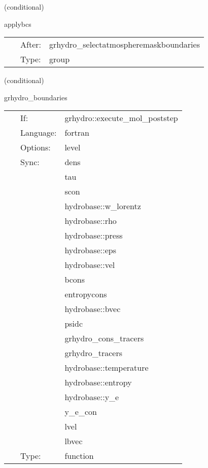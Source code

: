    (conditional) 

\hspace{5mm} applybcs 

\hspace{5mm}{\it apply boundary conditions to real-valued atmosphere mask } 


\hspace{5mm}

 \begin{tabular*}{160mm}{cll} 
~ & After:  & grhydro\_selectatmospheremaskboundaries \\ 
~ & Type:  & group \\ 
\end{tabular*} 


\vspace{5mm}

   (conditional) 

\hspace{5mm} grhydro\_boundaries 

\hspace{5mm}{\it select grhydro boundary conditions } 


\hspace{5mm}

 \begin{tabular*}{160mm}{cll} 
~ & If:  & grhydro::execute\_mol\_poststep \\ 
~ & Language:  & fortran \\ 
~ & Options:  & level \\ 
~ & Sync:  & dens \\ 
~& ~ &tau\\ 
~& ~ &scon\\ 
~& ~ &hydrobase::w\_lorentz\\ 
~& ~ &hydrobase::rho\\ 
~& ~ &hydrobase::press\\ 
~& ~ &hydrobase::eps\\ 
~& ~ &hydrobase::vel\\ 
~& ~ &bcons\\ 
~& ~ &entropycons\\ 
~& ~ &hydrobase::bvec\\ 
~& ~ &psidc\\ 
~& ~ &grhydro\_cons\_tracers\\ 
~& ~ &grhydro\_tracers\\ 
~& ~ &hydrobase::temperature\\ 
~& ~ &hydrobase::entropy\\ 
~& ~ &hydrobase::y\_e\\ 
~& ~ &y\_e\_con\\ 
~& ~ &lvel\\ 
~& ~ &lbvec\\ 
~ & Type:  & function \\ 
\end{tabular*} 


